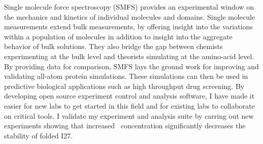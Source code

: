 Single molecule force spectroscopy (SMFS) provides an experimental
window on the mechanics and kinetics of individual molecules and
domains.  Single molecule measurements extend bulk measurements, by
offering insight into the variations within a population of molecules
in addition to insight into the aggregate behavior of bulk solutions.
They also bridge the gap between chemists experimenting at the bulk
level and theorists simulating at the amino-acid level.  By providing
data for comparison, SMFS lays the ground work for improving and
validating all-atom protein simulations.  These simulations can then
be used in predictive biological applications such as high throughput
drug screening.  By developing open source experiment control and
analysis software, I have made it easier for new labs to get started
in this field and for existing labs to collaborate on critical tools.
I validate my experiment and analysis suite by carring out new
experiments showing that increased \CaCl\ concentration significantly
decreases the stability of folded I27.
